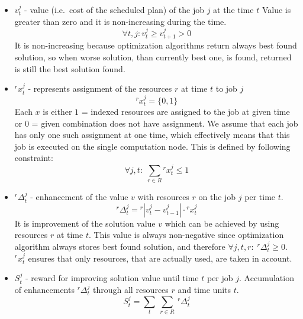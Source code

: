 \begin{itemize}
	\item $v_{t}^{j}$ - value (i.e.\ cost of the scheduled plan) of the job $j$ at the time $t$
	      Value is greater than zero and it is non-increasing during the time. 
	      \begin{equation}
	      	\forall t, j: v_{t}^{j} \geq v_{t+1}^{j} > 0 
	      \end{equation}
	      It is non-increasing because optimization algorithms return always best found solution, 
	      so when worse solution, than currently best one, is found,
	      returned is still the best solution found.
	\item $^{r}x_{t}^{j}$ - represents assignment of the resources $r$ at time $t$ to job $j$
	      \begin{equation}
	      	^{r}x_{t}^{j} = \{0, 1\} 
	      \end{equation}
	      Each $x$ is either $1$ = indexed resources are assigned to the job at given time or $0$ = given combination does not have assignment.
	      We assume that each job has only one such assignment at one time,
	      which effectively means that this job is executed on the single computation node.
	      This is defined by following constraint:
	      \begin{equation}
	      	\forall j, t:\; \sum_{r \in R} {}^{r}x_{t}^{j} \leq 1 
	      \end{equation}
	\item $^{r}\Delta_{t}^{j}$ - enhancement of the value $v$ with resources $r$ on the job $j$ per time $t$.
	      \begin{equation}
	      	^{r}\Delta_{t}^{j} = {}^{r}| v_{t}^{j} - v_{t-1}^{j}| \cdot {}^{r}x_{t}^{j}
	      \end{equation}
	      It is improvement of the solution value $v$ which can be achieved by using resources $r$ at time $t$.
	      This value is always non-negative since optimization algorithm always stores best found solution,
		  and therefore $\forall j, t, r:\; {}^{r}\Delta_{t}^{j} \geq 0$. 
		  ${}^{r}x_{t}^{j}$ ensures that only resources, 
		  that are actually used, are taken in account.
	\item $S_{t}^{j}$ - reward for improving solution value until time $t$ per job $j$.
	      Accumulation of enhancements $^{r}\Delta_{t}^{j}$ through all resources $r$ and time units $t$.
	      \begin{equation}
	      	S_{t}^{j} = \sum_{t}\:\sum_{r \in R}\: {}^{r}\Delta_{t}^{j} 
	      \end{equation}

\end{itemize}
